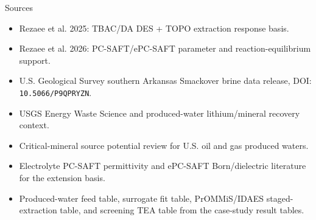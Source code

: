 \documentclass[aspectratio=169]{beamer}
\begin{document}
\begin{frame}{Sources}
  \begin{itemize}
    \item Rezaee et al. 2025: TBAC/DA DES + TOPO extraction response basis.
    \item Rezaee et al. 2026: PC-SAFT/ePC-SAFT parameter and reaction-equilibrium support.
    \item U.S. Geological Survey southern Arkansas Smackover brine data release,
      DOI: \texttt{10.5066/P9QPRYZN}.
    \item USGS Energy Waste Science and produced-water lithium/mineral recovery context.
    \item Critical-mineral source potential review for U.S. oil and gas
      produced waters.
    \item Electrolyte PC-SAFT permittivity and ePC-SAFT Born/dielectric
      literature for the extension basis.
    \item Produced-water feed table, surrogate fit table, PrOMMiS/IDAES
      staged-extraction table, and screening TEA table from the case-study result tables.
  \end{itemize}
\end{frame}
\end{document}
